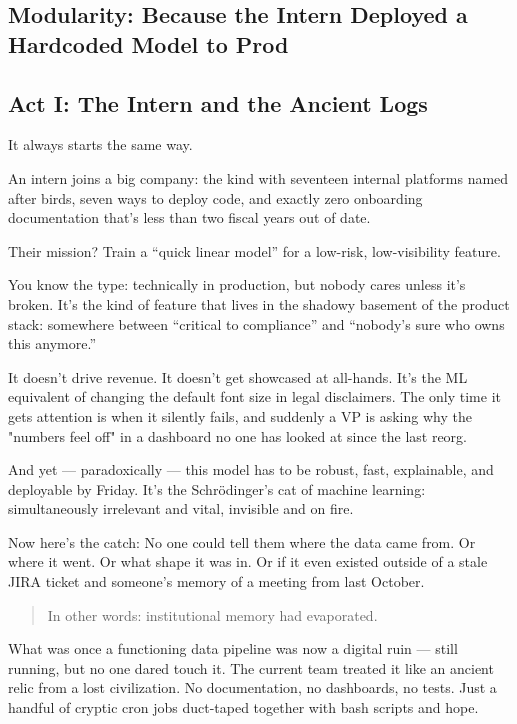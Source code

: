 \subsection{Modularity: Because the Intern Deployed a Hardcoded Model to Prod}

\subsection{Act I: The Intern and the Ancient Logs}

It always starts the same way.

An intern joins a big company: the kind with seventeen internal platforms named after birds, seven ways to deploy code, and exactly zero onboarding documentation that's less than two fiscal years out of date.

Their mission? Train a “quick linear model” for a low-risk, low-visibility feature.

You know the type: technically in production, but nobody cares unless it’s broken. It’s the kind of feature that lives in the shadowy basement of the product stack: somewhere between “critical to compliance” and “nobody’s sure who owns this anymore.” 

It doesn’t drive revenue. It doesn’t get showcased at all-hands. It’s the ML equivalent of changing the default font size in legal disclaimers. The only time it gets attention is when it silently fails, and suddenly a VP is asking why the "numbers feel off" in a dashboard no one has looked at since the last reorg.

And yet --- paradoxically --- this model has to be robust, fast, explainable, and deployable by Friday. It’s the Schrödinger’s cat of machine learning: simultaneously irrelevant and vital, invisible and on fire.


Now here's the catch: No one could tell them where the data came from.  Or where it went.  Or what shape it was in.  Or if it even existed outside of a stale JIRA ticket and someone’s memory of a meeting from last October.

\begin{quote}
In other words: institutional memory had evaporated.
\end{quote}

What was once a functioning data pipeline was now a digital ruin — still running, but no one dared touch it. The current team treated it like an ancient relic from a lost civilization. No documentation, no dashboards, no tests. Just a handful of cryptic cron jobs duct-taped together with bash scripts and hope.

